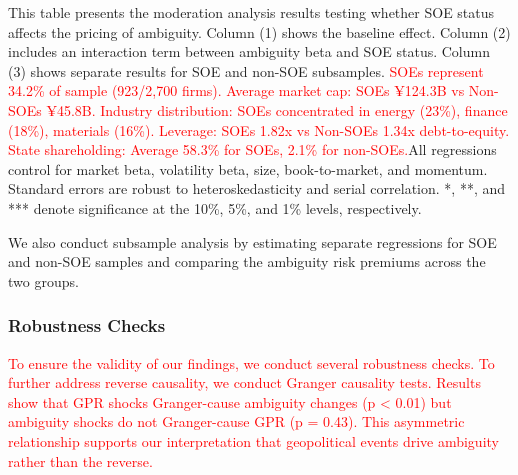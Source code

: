 \documentclass[preprint,12pt,authoryear]{elsarticle}
\begin{document}
\begin{table}[htbp]
\begin{threeparttable}
\begin{tablenotes}[flushleft]
\item[] This table presents the moderation analysis results testing whether SOE status affects the pricing of ambiguity. Column (1) shows the baseline effect. Column (2) includes an interaction term between ambiguity beta and SOE status. Column (3) shows separate results for SOE and non-SOE subsamples. \textcolor{red}{SOEs represent 34.2\% of sample (923/2,700 firms). Average market cap: SOEs ¥124.3B vs Non-SOEs ¥45.8B. Industry distribution: SOEs concentrated in energy (23\%), finance (18\%), materials (16\%). Leverage: SOEs 1.82x vs Non-SOEs 1.34x debt-to-equity. State shareholding: Average 58.3\% for SOEs, 2.1\% for non-SOEs.}All regressions control for market beta, volatility beta, size, book-to-market, and momentum. Standard errors are robust to heteroskedasticity and serial correlation. *, **, and *** denote significance at the 10\%, 5\%, and 1\% levels, respectively.
\end{tablenotes}
\end{threeparttable}
\end{table}

We also conduct subsample analysis by estimating separate regressions for SOE and non-SOE samples and comparing the ambiguity risk premiums across the two groups.

\subsubsection{Robustness Checks}
\label{sec:robustness}

\textcolor{red}{To ensure the validity of our findings, we conduct several robustness checks. To further address reverse causality, we conduct Granger causality tests. Results show that GPR shocks Granger-cause ambiguity changes (p < 0.01) but ambiguity shocks do not Granger-cause GPR (p = 0.43). This asymmetric relationship supports our interpretation that geopolitical events drive ambiguity rather than the reverse.}
\end{document}
